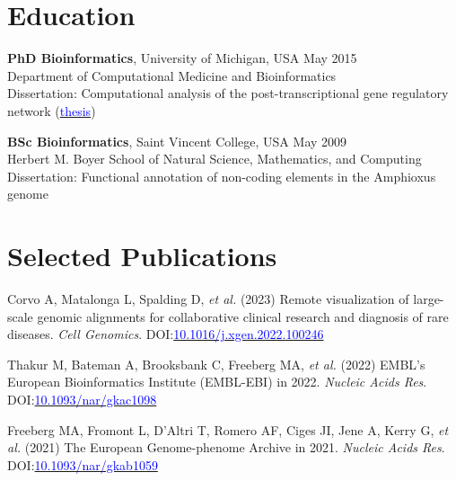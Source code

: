 \documentclass[margin,line]{res}
\begin{document}
\begin{resume}

\section{\sc Education}
{\bf PhD Bioinformatics}, University of Michigan, USA \hfill {May 2015}\\
Department of Computational Medicine and Bioinformatics\\ 
Dissertation: Computational analysis of the post-transcriptional gene regulatory network (\href{https://deepblue.lib.umich.edu/bitstream/handle/2027.42/111339/mafree_1.pdf?sequence=1&isAllowed=y}{\textcolor{blue}{thesis}})

{\bf BSc Bioinformatics}, Saint Vincent College, USA \hfill {May 2009}\\
Herbert M. Boyer School of Natural Science, Mathematics, and Computing\\
Dissertation: Functional annotation of non-coding elements in the Amphioxus genome

\section{\sc Selected Publications}

Corvo A, Matalonga L, Spalding D, {\em et al.} (2023) Remote visualization of large-scale genomic alignments for collaborative clinical research and diagnosis of rare diseases. {\em Cell Genomics}. DOI:\href{https://doi.org/10.1016/j.xgen.2022.100246}{\textcolor{blue}{10.1016/j.xgen.2022.100246}}

Thakur M, Bateman A, Brooksbank C, Freeberg MA, {\em et al.} (2022) EMBL's European Bioinformatics Institute (EMBL-EBI) in 2022. {\em Nucleic Acids Res}. DOI:\href{https://doi.org/10.1093/nar/gkac1098}{\textcolor{blue}{10.1093/nar/gkac1098}}

Freeberg MA, Fromont L, D'Altri T, Romero AF, Ciges JI, Jene A, Kerry G, {\em et al.} (2021) The European Genome-phenome Archive in 2021. {\em Nucleic Acids Res}. DOI:\href{https://doi.org/10.1093/nar/gkab1059}{\textcolor{blue}{10.1093/nar/gkab1059}}


\end{resume}
\end{document}
